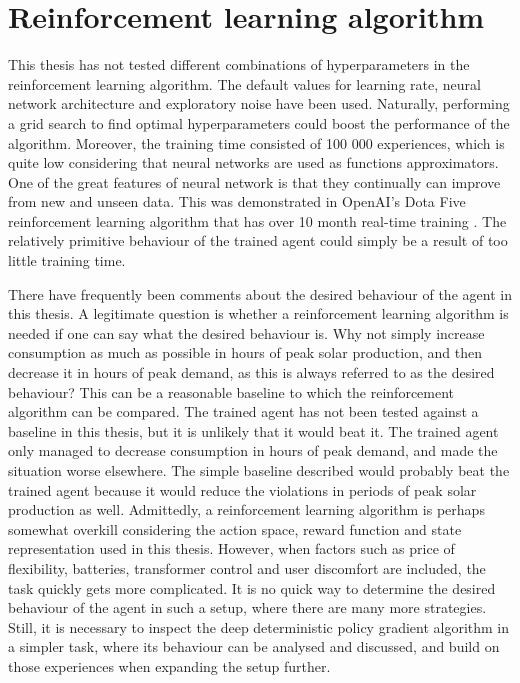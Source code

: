 \documentclass[class=book, crop=false, 11pt]{standalone}
\begin{document}
\section{Reinforcement learning algorithm}
This thesis has not tested different combinations of hyperparameters in the reinforcement learning algorithm. The default values for learning rate, neural network architecture and exploratory noise have been used. Naturally, performing a grid search to find optimal hyperparameters could boost the performance of the algorithm. Moreover, the training time consisted of 100 000 experiences, which is quite low considering that neural networks are used as functions approximators. One of the great features of neural network is that they continually can improve from new and unseen data. This was demonstrated in OpenAI's Dota Five reinforcement learning algorithm that has over 10 month real-time training \cite{openai_dota}. The relatively primitive behaviour of the trained agent could simply be a result of too little training time.

There have frequently been comments about the desired behaviour of the agent in this thesis. A legitimate question is whether a reinforcement learning algorithm is needed if one can say what the desired behaviour is. Why not simply increase consumption as much as possible in hours of peak solar production, and then decrease it in hours of peak demand, as this is always referred to as the desired behaviour? This can be a reasonable baseline to which the reinforcement algorithm can be compared. The trained agent has not been tested against a baseline in this thesis, but it is unlikely that it would beat it. The trained agent only managed to decrease consumption in hours of peak demand, and made the situation worse elsewhere. The simple baseline described would probably beat the trained agent because it would reduce the violations in periods of peak solar production as well. Admittedly, a reinforcement learning algorithm is perhaps somewhat overkill considering the action space, reward function and state representation used in this thesis. However, when factors such as price of flexibility, batteries, transformer control and user discomfort are included, the task quickly gets more complicated. It is no quick way to determine the desired behaviour of the agent in such a setup, where there are many more strategies. Still, it is necessary to inspect the deep deterministic policy gradient algorithm in a simpler task, where its behaviour can be analysed and discussed, and build on those experiences when expanding the setup further.
\end{document}
